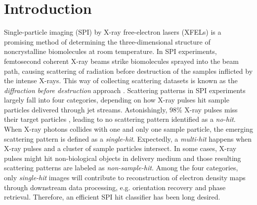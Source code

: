 




















\section{Introduction}


Single-particle imaging (SPI) by X-ray free-electron lasers (XFELs) is a
promising method of determining the three-dimensional structure of
noncrystalline biomolecules at room temperature.  In SPI experiments,
femtosecond coherent X-ray beams strike biomolecules sprayed into the beam path,
causing scattering of radiation before destruction of the samples inflicted by
the intense X-rays.  This way of collecting scattering datasets is known as the
\textit{diffraction before destruction} approach
\cite{neutzePotentialBiomolecularImaging2000,
chapmanFemtosecondDiffractiveImaging2006,seibertSingleMimivirusParticles2011,
aquilaLinacCoherentLight2015,reddyCoherentSoftXray2017a}.  Scattering patterns
in SPI experiments largely fall into four categories, depending on how X-ray
pulses hit sample particles delivered through jet streams.  Astonishingly, 98\%
X-ray pulses miss their target particles
\cite{shiEvaluationPerformanceClassification2019}, leading to no scattering
pattern identified as a \textit{no-hit}.  When X-ray photons collides with one
and only one sample particle, the emerging scattering pattern is defined as a
\textit{single-hit}. Expectedly, a \textit{multi-hit} happens when X-ray pulses
and a cluster of sample particles intersect. In some cases, X-ray pulses might
hit non-biological objects in delivery medium and those resulting scattering
patterns are labeled as \textit{non-sample-hit}.  Among the four categories,
only \textit{single-hit} images will contribute to reconstruction of electron
density maps through downstream data processing, e.g. orientation recovery and
phase retrieval.  Therefore, an efficient SPI hit classifier has been long
desired.  



